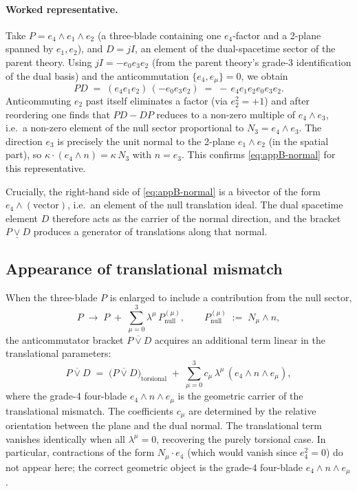 \documentclass[dvipdfmx,a4paper]{article}
\theoremstyle{definition}
\theoremstyle{plain}
\theoremstyle{remark}
\begin{document}
\paragraph{Worked representative.}
Take \(P = e_{4}\wedge e_{1}\wedge e_{2}\) (a three-blade containing one \(e_{4}\)-factor and a 2-plane spanned by \(e_{1},e_{2}\)), and \(D=jI\), an element of the dual-spacetime sector of the parent theory. Using \(jI=-e_{0}e_{3}e_{2}\) (from the parent theory's grade-3 identification of the dual basis) and the anticommutation \(\{e_{4},e_{\mu}\}=0\), we obtain
\[
PD \;=\; (e_{4}e_{1}e_{2})\,(-e_{0}e_{3}e_{2}) \;=\; -\,e_{4}e_{1}e_{2}e_{0}e_{3}e_{2}.
\]
Anticommuting \(e_{2}\) past itself eliminates a factor (via \(e_{2}^{2}=+1\)) and after reordering one finds that \(PD-DP\) reduces to a non-zero multiple of \(e_{4}\wedge e_{3}\), i.e.\ a non-zero element of the null sector proportional to \(N_{3}=e_{4}\wedge e_{3}\). The direction \(e_{3}\) is precisely the unit normal to the 2-plane \(e_{1}\wedge e_{2}\) (in the spatial part), so \(\kappa\cdot(e_{4}\wedge n) = \kappa\,N_{3}\) with \(n=e_{3}\). This confirms \eqref{eq:appB-normal} for this representative.

Crucially, the right-hand side of \eqref{eq:appB-normal} is a bivector of the form \(e_{4}\wedge(\text{vector})\), i.e.\ an element of the null translation ideal. The dual spacetime element \(D\) therefore acts as the carrier of the normal direction, and the bracket \(P\mathbin{\underline{\vee}}D\) produces a generator of translations along that normal.

\subsection{Appearance of translational mismatch}

When the three-blade \(P\) is enlarged to include a contribution from the null sector,
\[
P \;\to\; P \;+\; \sum_{\mu=0}^{3}\lambda^{\mu}\,P^{(\mu)}_{\text{null}},
\qquad
P^{(\mu)}_{\text{null}} \;:=\; N_{\mu}\wedge n,
\]
the anticommutator bracket \(P\mathbin{\overline{\vee}}D\) acquires an additional term linear in the translational parameters:
\[
P \mathbin{\overline{\vee}} D
\;=\; \bigl(P\mathbin{\overline{\vee}}D\bigr)_{\text{torsional}}
\;+\; \sum_{\mu=0}^{3} c_{\mu}\,\lambda^{\mu}\,(e_{4}\wedge n\wedge e_{\mu}),
\]
where the grade-4 four-blade \(e_{4}\wedge n\wedge e_{\mu}\) is the geometric carrier of the translational mismatch. The coefficients \(c_{\mu}\) are determined by the relative orientation between the plane and the dual normal. The translational term vanishes identically when all \(\lambda^{\mu}=0\), recovering the purely torsional case. In particular, contractions of the form \(N_{\mu}\cdot e_{4}\) (which would vanish since \(e_{4}^{2}=0\)) do not appear here; the correct geometric object is the grade-4 four-blade \(e_{4}\wedge n\wedge e_{\mu}\).
\end{document}

